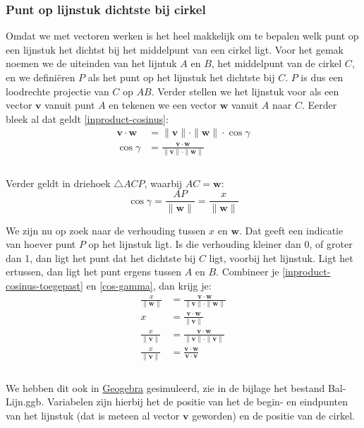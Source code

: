 \documentclass[12pt,a4paper]{article}
\begin{document}
	\subsubsection{Punt op lijnstuk dichtste bij cirkel}
	Omdat we met vectoren werken is het heel makkelijk om te bepalen welk punt op een lijnstuk het dichtst bij het middelpunt van een cirkel ligt. Voor het gemak noemen we de uiteinden van het lijntuk $A$ en $B$, het middelpunt van de cirkel $C$, en we defini\"{e}ren $P$ als het punt op het lijnstuk het dichtste bij $C$. $P$ is dus een loodrechte projectie van $C$ op $AB$. Verder stellen we het lijnstuk voor als een vector $\mathbf{v}$ vanuit punt $A$ en tekenen we een vector $\mathbf{w}$ vanuit $A$ naar $C$. Eerder bleek al dat geldt \eqref{inproduct-cosinus}:
	\begin{equation}
		\label{inproduct-cosinus-toegepast}
		\begin{aligned}
			\mathbf{v} \cdot \mathbf{w} &= \|\mathbf{v}\| \cdot \|\mathbf{w}\| \cdot \cos\gamma \\
			\cos\gamma &= \frac{\mathbf{v} \cdot \mathbf{w}}{\|\mathbf{v}\| \cdot \|\mathbf{w}\|}\\
		\end{aligned}
	\end{equation}
	\\Verder geldt in driehoek $\triangle ACP$, waarbij $AC = \mathbf{w}$:
	\begin{equation}
		\label{cos-gamma}
		\cos\gamma = \frac{AP}{\|\mathbf{w}\|} = \frac{x}{\|\mathbf{w}\|}
	\end{equation}

	We zijn nu op zoek naar de verhouding tussen $x$ en $\mathbf{w}$. Dat geeft een indicatie van hoever punt $P$ op het lijnstuk ligt. Is die verhouding kleiner dan 0, of groter dan 1, dan ligt het punt dat het dichtste bij $C$ ligt, voorbij het lijnstuk. Ligt het ertussen, dan ligt het punt ergens tussen $A$ en $B$.
	Combineer je \eqref{inproduct-cosinus-toegepast} en \eqref{cos-gamma}, dan krijg je:
	\begin{equation}
		\begin{aligned}
		\frac{x}{\|\mathbf{w}\|} &= \frac{\mathbf{v} \cdot \mathbf{w}}{\|\mathbf{v}\| \cdot \|\mathbf{w}\|} \\
		                       x &= \frac{\mathbf{v} \cdot \mathbf{w}}{\|\mathbf{v}\|} \\
		\frac{x}{\|\mathbf{v}\|} &= \frac{\mathbf{v} \cdot \mathbf{w}}{\|\mathbf{v}\| \cdot \|\mathbf{v}\|} \\
		\frac{x}{\|\mathbf{v}\|} &= \frac{\mathbf{v} \cdot \mathbf{w}}{\mathbf{v} \cdot \mathbf{v}}\\
		\end{aligned}
	\end{equation}
	\\We hebben dit ook in \href{http://www.geogebra.org/webstart/geogebra.html}{Geogebra} gesimuleerd, zie in de bijlage het bestand Bal-Lijn.ggb. Variabelen zijn hierbij het de positie van het de begin- en eindpunten van het lijnstuk (dat is meteen al vector $\mathbf{v}$ geworden) en de positie van de cirkel.
	
\end{document}
